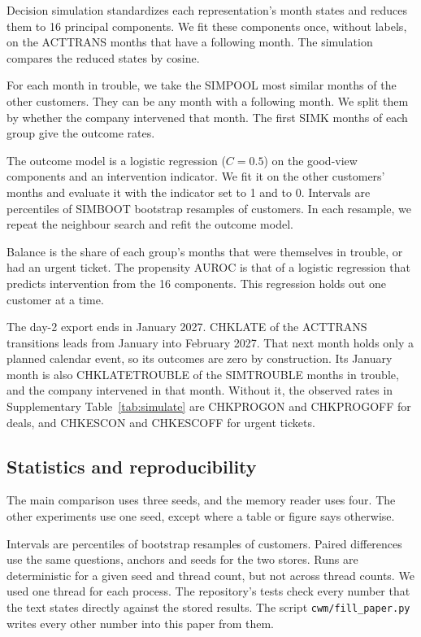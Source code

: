 \documentclass[11pt]{article}
\begin{document}
Decision simulation standardizes each representation's month states and reduces them to 16 principal components. We fit these components once, without labels, on the ACTTRANS months that have a following month. The simulation compares the reduced states by cosine.

For each month in trouble, we take the SIMPOOL most similar months of the other customers. They can be any month with a following month. We split them by whether the company intervened that month. The first SIMK months of each group give the outcome rates.

The outcome model is a logistic regression ($C = 0.5$) on the good-view components and an intervention indicator. We fit it on the other customers' months and evaluate it with the indicator set to 1 and to 0. Intervals are percentiles of SIMBOOT bootstrap resamples of customers. In each resample, we repeat the neighbour search and refit the outcome model.

Balance is the share of each group's months that were themselves in trouble, or had an urgent ticket. The propensity AUROC is that of a logistic regression that predicts intervention from the 16 components. This regression holds out one customer at a time.

The day-2 export ends in January 2027. CHKLATE of the ACTTRANS transitions leads from January into February 2027. That next month holds only a planned calendar event, so its outcomes are zero by construction. Its January month is also CHKLATETROUBLE of the SIMTROUBLE months in trouble, and the company intervened in that month. Without it, the observed rates in Supplementary Table~\ref{tab:simulate} are CHKPROGON and CHKPROGOFF for deals, and CHKESCON and CHKESCOFF for urgent tickets.

\subsection{Statistics and reproducibility}
The main comparison uses three seeds, and the memory reader uses four. The other experiments use one seed, except where a table or figure says otherwise.

Intervals are percentiles of bootstrap resamples of customers. Paired differences use the same questions, anchors and seeds for the two stores. Runs are deterministic for a given seed and thread count, but not across thread counts. We used one thread for each process. The repository's tests check every number that the text states directly against the stored results. The script \texttt{cwm/fill\_paper.py} writes every other number into this paper from them.
\end{document}
